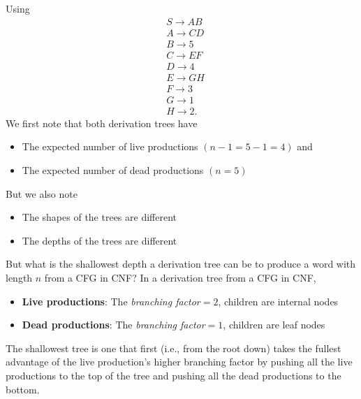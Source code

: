 \documentclass{report}
\begin{document}
\begin{itemize}
            \bigbreak \noindent 
            Using
            \begin{align*}
                &S \to AB \\
                &A \to CD \\
                &B \to 5 \\
                &C \to EF \\ 
                &D \to 4 \\ 
                &E \to GH \\
                &F \to 3 \\
                &G \to 1 \\
                &H \to 2
            .\end{align*}
            \bigbreak \noindent 
            We first note that both derivation trees have
            \begin{itemize}
                \item The expected number of live productions $(n-1 = 5-1 = 4)$ and
                \item The expected number of dead productions $(n = 5)$
            \end{itemize}
            \bigbreak \noindent 
            But we also note
            \begin{itemize}
                \item The shapes of the trees are different
                \item The depths of the trees are different
            \end{itemize}
            \bigbreak \noindent 
            But what is the shallowest depth a derivation tree can be to produce a word with length $n$ from a CFG in CNF?
            \bigbreak \noindent 
            In a derivation tree from a CFG in CNF, 
            \begin{itemize}
                \item \textbf{Live productions}: The \textit{branching factor}$ = 2$, children are internal nodes
                \item \textbf{Dead productions}: The \textit{branching factor}$ = 1$, children are leaf nodes
            \end{itemize}
            \bigbreak \noindent 
            The shallowest tree is one that first (i.e., from the root down) takes the fullest advantage of the live production's higher branching factor by pushing all the live productions to the top of the tree and pushing all the dead productions to the bottom.
            \bigbreak \noindent 

\end{itemize}
\end{document}
